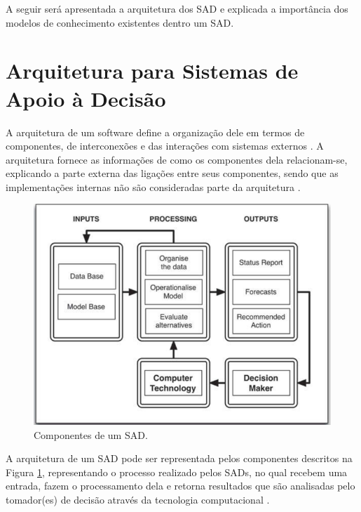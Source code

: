 A seguir será apresentada a arquitetura dos SAD e explicada a importância
dos modelos de conhecimento existentes dentro um SAD. 

\section{Arquitetura para Sistemas de Apoio à Decisão}

A arquitetura de um software define a organização dele em termos de
componentes, de interconexões e das interações com sistemas externos
\citep{de1997software}. A arquitetura fornece as informações de como
os componentes dela relacionam-se, explicando a parte externa das
ligações entre seus componentes, sendo que as implementações internas
não são consideradas parte da arquitetura \citep{sei2006architecture}.

\begin{figure}[H]
\noindent \begin{centering}
\includegraphics[width=0.8\columnwidth]{figures/DSS}
\par\end{centering}
\caption{Componentes de um SAD.\label{fig:Componentes-SAD} }

\end{figure}

A arquitetura de um SAD pode ser representada pelos componentes descritos
na Figura \ref{fig:Componentes-SAD}, representando o processo realizado
pelos SADs, no qual recebem uma entrada, fazem o processamento dela
e retorna resultados que são analisadas pelo tomador(es) de decisão
através da tecnologia computacional \citep{Tweedale2016}. 

